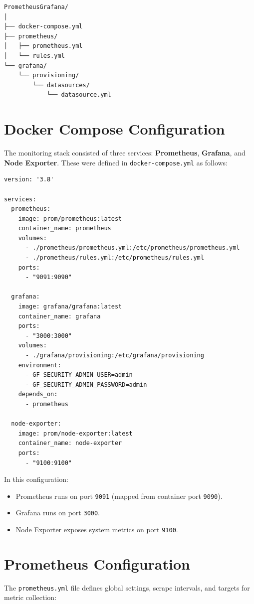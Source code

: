 \begin{verbatim}
PrometheusGrafana/
│
├── docker-compose.yml
├── prometheus/
│   ├── prometheus.yml
│   └── rules.yml
└── grafana/
    └── provisioning/
        └── datasources/
            └── datasource.yml
\end{verbatim}

\section{Docker Compose Configuration}
The monitoring stack consisted of three services: \textbf{Prometheus}, \textbf{Grafana}, and \textbf{Node Exporter}. 
These were defined in \texttt{docker-compose.yml} as follows:

\begin{verbatim}
version: '3.8'

services:
  prometheus:
    image: prom/prometheus:latest
    container_name: prometheus
    volumes:
      - ./prometheus/prometheus.yml:/etc/prometheus/prometheus.yml
      - ./prometheus/rules.yml:/etc/prometheus/rules.yml
    ports:
      - "9091:9090"

  grafana:
    image: grafana/grafana:latest
    container_name: grafana
    ports:
      - "3000:3000"
    volumes:
      - ./grafana/provisioning:/etc/grafana/provisioning
    environment:
      - GF_SECURITY_ADMIN_USER=admin
      - GF_SECURITY_ADMIN_PASSWORD=admin
    depends_on:
      - prometheus

  node-exporter:
    image: prom/node-exporter:latest
    container_name: node-exporter
    ports:
      - "9100:9100"
\end{verbatim}

\noindent
In this configuration:
\begin{itemize}
    \item Prometheus runs on port \texttt{9091} (mapped from container port \texttt{9090}).
    \item Grafana runs on port \texttt{3000}.
    \item Node Exporter exposes system metrics on port \texttt{9100}.
\end{itemize}

\section{Prometheus Configuration}
The \texttt{prometheus.yml} file defines global settings, scrape intervals, and targets for metric collection:

